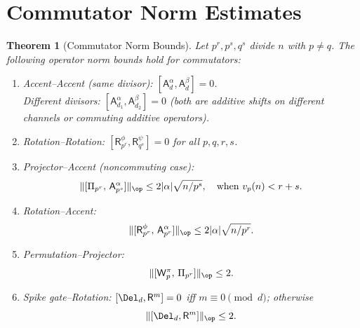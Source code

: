 \documentclass[11pt]{amsart}
\newtheorem{theorem}{Theorem}[section]
\newcommand{\Prj}{\Pi}
\newcommand{\Ap}{\mathsf{A}}
\newcommand{\Rp}{\mathsf{R}}
\newcommand{\Wp}{\mathsf{W}}
\newcommand{\vp}{v_p}
\newcommand{\norm}[1]{\lVert #1 \rVert}
\begin{document}
\section{Commutator Norm Estimates}
\label{sec:commutators}

\begin{theorem}[Commutator Norm Bounds]\label{thm:commutators}
Let $p^r, p^s, q^s$ divide $n$ with $p \neq q$. The following operator norm bounds hold for commutators:

\begin{enumerate}
  \item[(i)] \emph{Accent–Accent (same divisor):} $[\Ap^\alpha_d, \Ap^\beta_d] = 0$. \\
    \emph{Different divisors:} $[\Ap^\alpha_{d_1}, \Ap^\beta_{d_2}] = 0$ (both are additive shifts on different channels or commuting additive operators).
  
  \item[(ii)] \emph{Rotation–Rotation:} $[\Rp^\phi_{p^r}, \Rp^\psi_{q^s}] = 0$ for all $p,q,r,s$.
  
  \item[(iii)] \emph{Projector–Accent (noncommuting case):}
  \[
    \norm{[\Prj_{p^r},\, \Ap^\alpha_{p^s}]}_\op \leq 2|\alpha|\sqrt{n/p^s}, \quad \text{when } \vp(n) < r+s.
  \]
  
  \item[(iv)] \emph{Rotation–Accent:}
  \[
    \norm{[\Rp^\phi_{p^r},\, \Ap^\alpha_{p^r}]}_\op \leq 2|\alpha|\sqrt{n/p^r}.
  \]
  
  \item[(v)] \emph{Permutation–Projector:}
  \[
    \norm{[\Wp^\pi_p,\, \Prj_{p^r}]}_\op \leq 2.
  \]
  
  \item[(vi)] \emph{Spike gate–Rotation:}
  $[\Del_d, \Rp^m] = 0$ iff $m \equiv 0 \pmod{d}$; otherwise
  \[
    \norm{[\Del_d, \Rp^m]}_\op \leq 2.
  \]
\end{enumerate}
\end{theorem}
\end{document}
